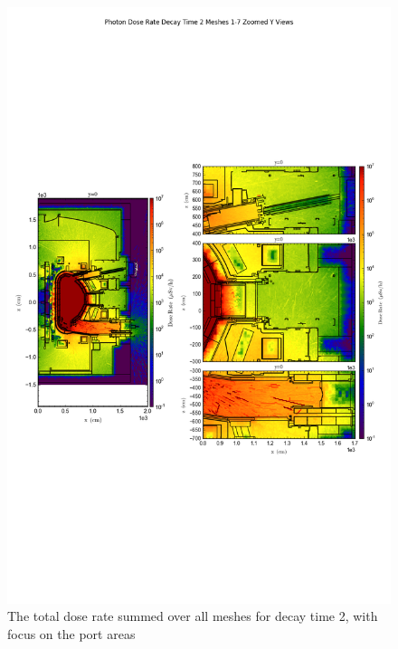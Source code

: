 \documentclass[12pt]{article}
\begin{document}
\begin{figure}[ht!]
\centering
\includegraphics[trim={0cm 9cm 0cm 10cm},clip,scale=0.75]{../plots/final_model_with_b4c/Photon_Dose_Rate_Decay_Time_2_Meshes_1-7_Zoomed_Y_Views.png}
\caption{The total dose rate summed over all meshes for decay time 2, with focus on the port areas}
\label{fig:photons_dc2_b4c_total_zoomed}
\end{figure}
\end{document}
